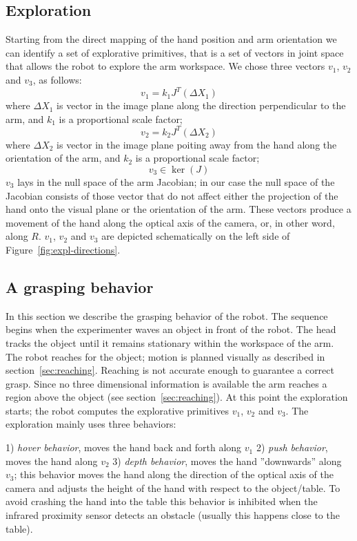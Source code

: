 \subsection{Exploration}
Starting from the direct mapping of the hand position and arm orientation we 
can identify a set of explorative primitives, that is a set of vectors in 
joint space that allows the robot to explore the arm workspace. We chose three 
vectors $v_1$, $v_2$ and $v_3$, as follows:
\begin{equation}
  v_1=k_1J^T\left(\Delta X_1\right)
\end{equation}
where $\Delta X_1$ is vector in the image plane along the direction 
perpendicular to the arm, and $k_1$ is a proportional scale factor;
\begin{equation}
  v_2=k_2J^T\left(\Delta X_2\right)
\end{equation}
where $\Delta X_2$ is vector in the image plane poiting away from the hand 
along the orientation of the arm, and $k_2$ is a proportional scale factor;
\begin{equation}
 v_3\in \ker \left(J\right)
\end{equation}
$v_3$ lays in the null space of the arm Jacobian; in our case the 
null space of the Jacobian consists of those vector that do not affect 
either the projection of the hand onto the visual plane or the orientation 
of the arm. These vectors produce a movement of the hand along the optical 
axis of the camera, or, in other word, along $R$.
$v_1$, $v_2$ and $v_3$ are depicted schematically on the left side of 
Figure~\ref{fig:expl-directions}.

\subsection{A grasping behavior}
In this section we describe the grasping behavior of the robot. The 
sequence begins when the experimenter waves an object in front of the 
robot. The head tracks the object until it remains stationary within 
the workspace of the arm. The robot reaches for the object; motion 
is planned visually as described in section~\ref{sec:reaching}. 
Reaching is not accurate enough to guarantee a correct grasp. Since no 
three dimensional information is available the arm reaches a region 
above the object (see section~\ref{sec:reaching}). At this point the 
exploration starts; the robot computes the explorative 
primitives $v_1$, $v_2$ and $v_3$. The exploration mainly uses three behaviors:

1) \emph{hover behavior}, moves the hand back and forth along $v_1$
2) \emph{push behavior}, moves the hand along $v_2$
3) \emph{depth behavior},  moves the hand ''downwards'' along $v_3$; 
this behavior moves the hand along the direction of the optical axis 
of the camera and adjusts the height of the hand with respect to the 
object/table. To avoid crashing the hand into the table this behavior 
is inhibited when the infrared proximity sensor detects an obstacle 
(usually this happens close to the table).

